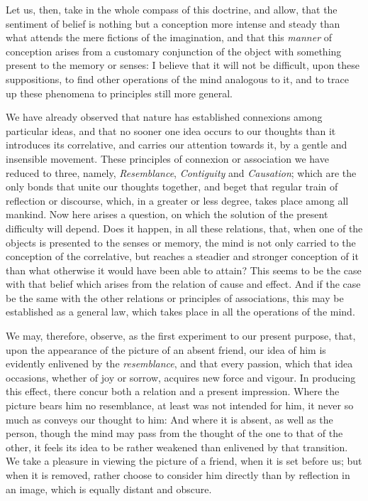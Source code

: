 \documentclass[]{article}
\begin{document}
\begin{sectionbody}
\humeparagraph  Let us, then, take in the whole compass of this doctrine, and allow, that the sentiment of belief is nothing but a conception more intense and steady than what attends the mere fictions of the imagination, and that this \emph{manner} of conception arises from a customary conjunction of the object with something present to the memory or senses: I believe that it will not be difficult, upon these suppositions, to find other operations of the mind analogous to it, and to trace up these phenomena to principles still more general.

\humeparagraph  We have already observed that nature has established connexions among particular ideas, and that no sooner one idea occurs to our thoughts than it introduces its correlative, and carries our attention towards it, by a gentle and insensible movement. These principles of connexion or association we have reduced to three, namely, \emph{Resemblance}, \emph{Contiguity} and \emph{Causation}; which are the only bonds that unite our thoughts together, and beget that regular train of reflection or discourse, which, in a greater or less degree, takes place among all mankind. Now here arises a question, on which the solution of the present difficulty will depend. Does it happen, in all these relations, that, when one of the objects is presented to the senses or memory, the mind is not only carried to the conception of the correlative, but reaches a steadier and stronger conception of it than what otherwise it would have been able to attain? This seems to be the case with that belief which arises from the relation of cause and effect. And if the case be the same with the other relations or principles of associations, this may be established as a general law, which takes place in all the operations of the mind.

\humeparagraph  We may, therefore, observe, as the first experiment to our present purpose, that, upon the appearance of the picture of an absent friend, our idea of him is evidently enlivened by the \emph{resemblance}, and that every passion, which that idea occasions, whether of joy or sorrow, acquires new force and vigour. In producing this effect, there concur both a relation and a present impression. Where the picture bears him no resemblance, at least was not intended for him, it never so much as conveys our thought to him: And where it is absent, as well as the person, though the mind may pass from the thought of the one to that of the other, it feels its idea to be rather weakened than enlivened by that transition. We take a pleasure in viewing the picture of a friend, when it is set before us; but when it is removed, rather choose to consider him directly than by reflection in an image, which is equally distant and obscure.


\end{sectionbody}
\end{document}

